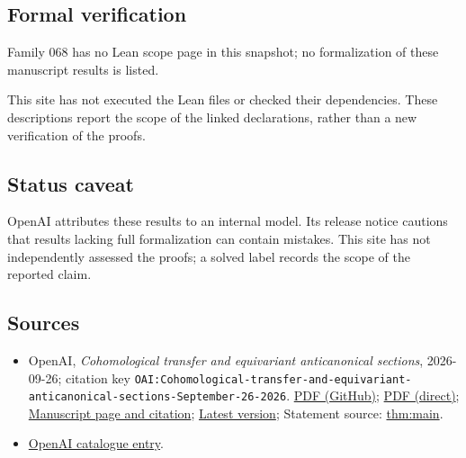 \documentclass[11pt]{article}
\begin{document}
\subsection{Formal verification}
Family 068 has no Lean scope page in this snapshot; no formalization of these manuscript results is listed.

This site has not executed the Lean files or checked their dependencies. These descriptions report the scope of the linked declarations, rather than a new verification of the proofs.

\subsection{Status caveat}
OpenAI attributes these results to an internal model. Its release notice cautions that results lacking full formalization can contain mistakes. This site has not independently assessed the proofs; a solved label records the scope of the reported claim.

\subsection{Sources}
\begin{itemize}
\item OpenAI, \emph{Cohomological transfer and equivariant anticanonical sections}, 2026-09-26; citation key \texttt{OAI:Cohomological-transfer-and-equivariant-anticanonical-sections-September-26-2026}. \href{https://github.com/openai/math/blob/adc7f1241b42e322a6451854ab7e4b4c146bf78a/preprints/Cohomological-transfer-and-equivariant-anticanonical-sections-September-26-2026/main.pdf}{PDF (GitHub)}; \href{https://github.com/openai/math/raw/adc7f1241b42e322a6451854ab7e4b4c146bf78a/preprints/Cohomological-transfer-and-equivariant-anticanonical-sections-September-26-2026/main.pdf}{PDF (direct)}; \href{https://github.com/openai/math/blob/adc7f1241b42e322a6451854ab7e4b4c146bf78a/preprints/Cohomological-transfer-and-equivariant-anticanonical-sections-September-26-2026/README.md}{Manuscript page and citation}; \href{https://github.com/openai/math/blob/main/preprints/Cohomological-transfer-and-equivariant-anticanonical-sections-September-26-2026/main.pdf}{Latest version}; Statement source: \href{https://github.com/openai/math/blob/adc7f1241b42e322a6451854ab7e4b4c146bf78a/preprints/Cohomological-transfer-and-equivariant-anticanonical-sections-September-26-2026/build/source/sections/cohomological-input.tex\#L74}{thm:main}.
\item \href{https://github.com/openai/math/blob/adc7f1241b42e322a6451854ab7e4b4c146bf78a/CONTENTS.md}{OpenAI catalogue entry}.
\end{itemize}
\end{document}
